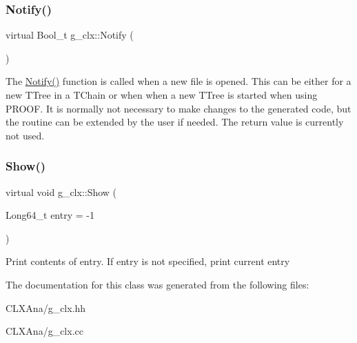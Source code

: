 \subsubsection{\texorpdfstring{Notify()}{Notify()}}
{\footnotesize\ttfamily virtual Bool\+\_\+t g\+\_\+clx\+::\+Notify (\begin{DoxyParamCaption}{ }\end{DoxyParamCaption})\hspace{0.3cm}{\ttfamily [virtual]}}

The \hyperlink{classg__clx_a1fe81316168bc18dc2325ca5595577a9}{Notify()} function is called when a new file is opened. This can be either for a new T\+Tree in a T\+Chain or when when a new T\+Tree is started when using P\+R\+O\+OF. It is normally not necessary to make changes to the generated code, but the routine can be extended by the user if needed. The return value is currently not used. \mbox{\label{classg__clx_ae86183470c7bb8db45753aa4c86f1d41}} 
\subsubsection{\texorpdfstring{Show()}{Show()}}
{\footnotesize\ttfamily virtual void g\+\_\+clx\+::\+Show (\begin{DoxyParamCaption}\item[{Long64\+\_\+t}]{entry = {\ttfamily -\/1} }\end{DoxyParamCaption})\hspace{0.3cm}{\ttfamily [virtual]}}

Print contents of entry. If entry is not specified, print current entry 

The documentation for this class was generated from the following files\+:\begin{DoxyCompactItemize}
\item 
C\+L\+X\+Ana/g\+\_\+clx.\+hh\item 
C\+L\+X\+Ana/g\+\_\+clx.\+cc\end{DoxyCompactItemize}
